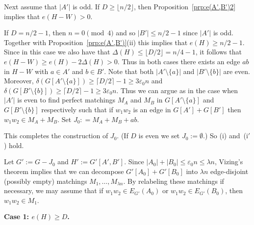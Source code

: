 \documentclass{memo-l}
\def\COMMENT#1{}
\def\eps{\varepsilon}
\def\epszero{\eps_0}
\numberwithin{section}{chapter}
\numberwithin{equation}{section}
\numberwithin{firstthm}{section}
\numberwithin{figure}{section}
\begin{document}
Next assume that $|A'|$ is odd.
If $D \ge \lfloor n/2\rfloor$, then Proposition~\ref{prp:e(A',B')2} implies that $e(H- W) >0$.%
    \COMMENT{We can apply Proposition~\ref{prp:e(A',B')2} since $D\le (1/2+\eps_0)n$ as
$(G,A,A_0,B,B_0)$ is an $(\epszero,K)$-framework and so $|A'|\ge |B'|\ge D/2$.} 
If $D= n/2-1$, then $n = 0 \pmod4$ and so $|B'|\le n/2-1$ since $|A'|$ is odd.
Together with Proposition~\ref{prp:e(A',B')}(ii) this implies that $e(H) \ge n/2 -1$.
Since in this case we also have that $\Delta(H) \le \lfloor D/2 \rfloor = n/4-1$, it follows that $e(H- W) \ge e(H) - 2 \Delta(H) >0$.
Thus in both cases there exists an edge $ab$ in $H-W$ with $a\in A'$ and $b\in B'$.
Note that both $|A' \setminus \{a\}|$ and $|B' \setminus \{b\}|$ are even.
Moreover, $\delta(G[A' \setminus \{a\}]) \ge \lceil D/2 \rceil -1 \ge 3 \epszero n $ and
$\delta(G[B' \setminus \{b\}]) \ge \lceil D/2 \rceil -1 \ge 3 \epszero n $.
Thus we can argue as in the case when $|A'|$ is even to find perfect matchings $M_A$ and $M_B$ in $G[A' \setminus \{a\}]$ and $G[B' \setminus \{b\}]$ respectively
such that if $ w_1w_2$ is an edge in $G[A']+G[B']$ then $w_1w_2 \in M_A+M_B$. Set $J_0: = M_A + M_B+ab$.

This completes the construction of $J_0$. (If $D$ is even we set $J_0:=\emptyset$.) So (i) and~(i$'$) hold.%
   \COMMENT{Daniela: added (i$'$)}
Let $G' := G - J_0$ and $H' := G'[A',B']$.
Since $|A_0|+|B_0| \le \epszero n \le \lambda n $, Vizing's theorem implies that
we can decompose $G'[A_0] + G'[B_0]$ into $\lambda n$ edge-disjoint (possibly empty) matchings $M_1, \dots ,M_{\lambda n }$.
By relabeling these matchings if necessary, we may assume that if
$w_1w_2\in E_{G'}(A_0)$ or $w_1w_2\in E_{G'}(B_0)$, then $w_1w_2 \in M_1$.

\medskip

\noindent \textbf{Case 1: $e(H)\ge D$.}

\smallskip
\end{document}

